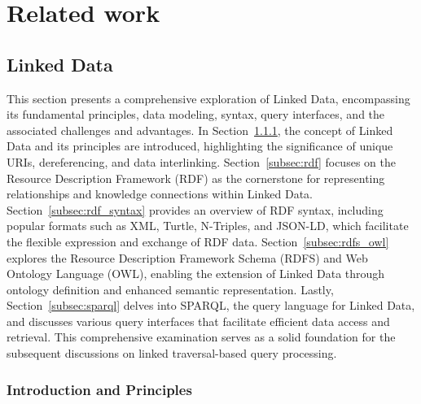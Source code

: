 \chapter{Related work}
\label{chap:rel_work}

\section{Linked Data}

This section presents a comprehensive exploration of Linked Data, encompassing its fundamental principles, data modeling, syntax, query interfaces, and the associated challenges and advantages. In Section~\ref{subsec:introduction_principles}, the concept of Linked Data and its principles are introduced, highlighting the significance of unique URIs, dereferencing, and data interlinking. Section~\ref{subsec:rdf} focuses on the Resource Description Framework (RDF) as the cornerstone for representing relationships and knowledge connections within Linked Data. Section~\ref{subsec:rdf_syntax} provides an overview of RDF syntax, including popular formats such as XML, Turtle, N-Triples, and JSON-LD, which facilitate the flexible expression and exchange of RDF data. Section~\ref{subsec:rdfs_owl} explores the Resource Description Framework Schema (RDFS) and Web Ontology Language (OWL), enabling the extension of Linked Data through ontology definition and enhanced semantic representation. Lastly, Section~\ref{subsec:sparql} delves into SPARQL, the query language for Linked Data, and discusses various query interfaces that facilitate efficient data access and retrieval. This comprehensive examination serves as a solid foundation for the subsequent discussions on linked traversal-based query processing.

\subsection{Introduction and Principles}
\label{subsec:introduction_principles}

